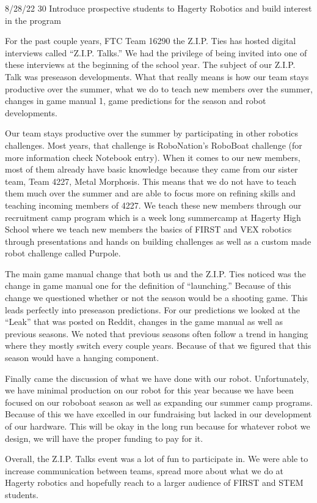 {8/28/22}
{30}
{Introduce prospective students to Hagerty Robotics and build interest in the program} 
{
For the past couple years, FTC Team 16290 the Z.I.P. Ties has hosted digital interviews called “Z.I.P. Talks.” We had the privilege of being invited into one of these interviews at the beginning of the school year. The subject of our Z.I.P. Talk was preseason developments. What that really means is how our team stays productive over the summer, what we do to teach new members over the summer, changes in game manual 1, game predictions for the season and robot developments. 

Our team stays productive over the summer by participating in other robotics challenges. Most years, that challenge is RoboNation’s RoboBoat challenge (for more information check Notebook entry). 
When it comes to our new members, most of them already have basic knowledge because they came from our sister team, Team 4227, Metal Morphosis. This means that we do not have to teach them much over the summer and are able to focus more on refining skills and teaching incoming members of 4227. We teach these new members through our recruitment camp program which is a week long summercamp at Hagerty High School where we teach new members the basics of FIRST and VEX robotics through presentations and hands on building challenges as well as a custom made robot challenge called Purpole. 

The main game manual change that both us and the Z.I.P. Ties noticed was the change in game manual one for the definition of “launching.” Because of this change we questioned whether or not the season would be a shooting game. This leads perfectly into preseason predictions. For our predictions we looked at the “Leak” that was posted on Reddit, changes in the game manual as well as previous seasons. We noted that previous seasons often follow a trend in hanging where they mostly switch every couple years. Because of that we figured that this season would have a hanging component.

Finally came the discussion of what we have done with our robot. Unfortunately, we have minimal production on our robot for this year because we have been focused on our roboboat season as well as expanding our summer camp programs. Because of this we have excelled in our fundraising but lacked in our development of our hardware. This will be okay in the long run because for whatever robot we design, we will have the proper funding to pay for it.

Overall, the Z.I.P. Talks event was a lot of fun to participate in. We were able to increase communication between teams, spread more about what we do at Hagerty robotics and hopefully reach to a larger audience of FIRST and STEM students.


} 

